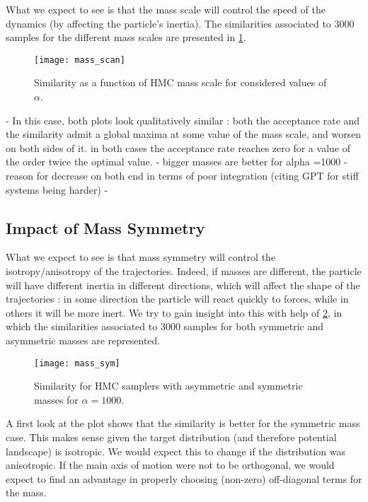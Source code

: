 \documentclass[a4paper, 12pt,oneside]{article}
\begin{document}
			What we expect to see is that the mass scale will control the speed of the dynamics (by affecting the particle's inertia).
			The similarities associated to 3000 samples for the different mass scales are presented in \ref{fig:mass-scan}.
			\begin{figure}[htb]
				\centering
					\vspace{0em}
					\texttt{[image: mass\_scan]}
					\caption{Similarity as a function of HMC mass scale for considered values of $\alpha$.}
					\label{fig:mass-scan}
			\end{figure}
			- In this case, both plots look qualitatively similar : both the acceptance rate and the similarity admit a global maxima at some value of the mass scale, and worsen on both sides of it. in both cases the acceptance rate reaches zero for a value of the order twice the optimal value.  
			- bigger masses are better for alpha =1000
			- reason for decrease on both end in terms of poor integration (citing GPT for stiff systems being harder)
			- 
			\subsection{Impact of Mass Symmetry}
			What we expect to see is that mass symmetry will control the isotropy/anisotropy of the trajectories. Indeed, if masses are different, the particle will have different inertia in different directions, which will affect the shape of the trajectories : in some direction the particle will react quickly to forces, while in others it will be more inert. We try to gain insight into this with help of  \ref{fig:mass-sym}, in which the similarities associated to 3000 samples for both symmetric and asymmetric masses are represented.
			\begin{figure}[htb]
				\centering
					\vspace{0em}
					\texttt{[image: mass\_sym]}
					\caption{Similarity for HMC samplers with asymmetric and symmetric masses for $\alpha=1000$.}
					\label{fig:mass-sym}
			\end{figure}
			A first look at the plot shows that the similarity is better for the symmetric mass case. This makes sense given the target distribution (and therefore potential landscape) is isotropic. We would expect this to change if the distribution was anisotropic. If the main axis of motion were not to be orthogonal, we would expect to find an advantage in properly choosing (non-zero) off-diagonal terms for the mass. 
			
\end{document}
